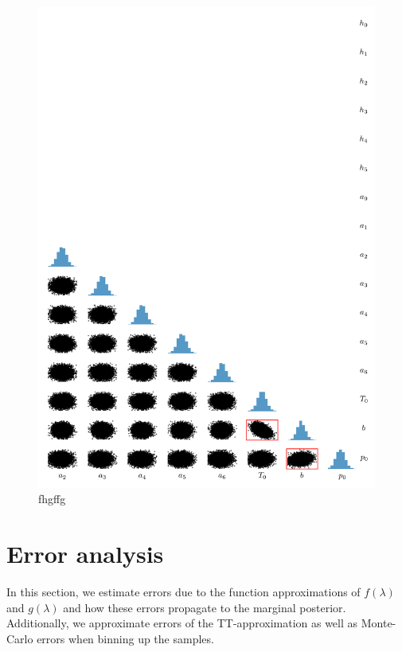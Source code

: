 \begin{figure}%
		\includegraphics[]{2ndCorrPlot.png}
		\caption*{fhgffg}
\end{figure}
\cleardoublepage
\section{Error analysis}
In this section, we estimate errors due to the function approximations of $f(\lambda)$ and $g(\lambda)$ and how these errors propagate to the marginal posterior.
Additionally, we approximate errors of the TT-approximation as well as Monte-Carlo errors when binning up the samples.

